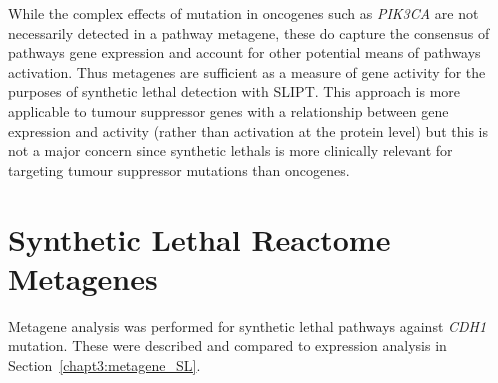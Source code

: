 While the complex effects of \gls{mutation} in \glspl{oncogene} such as \textit{PIK3CA} are not necessarily detected in a \gls{pathway} \gls{metagene}, these do capture the consensus of \glspl{pathway} \gls{gene expression} and account for other potential means of \glspl{pathway} activation. Thus \glspl{metagene} are sufficient as a measure of gene activity for the purposes of \gls{synthetic lethal} detection with \gls{SLIPT}. This approach is more applicable to \gls{tumour suppressor} genes with a relationship between \gls{gene expression} and activity (rather than activation at the protein level) but this is not a major concern since \glspl{synthetic lethal} is more clinically relevant for targeting \gls{tumour suppressor} \glspl{mutation} than \glspl{oncogene}.
\fi


\FloatBarrier


\section{Synthetic Lethal Reactome Metagenes} \label{appendix:metagene_mtSL}

Metagene analysis was performed for synthetic lethal pathways against \textit{CDH1} mutation. These were described and compared to expression analysis in Section~\ref{chapt3:metagene_SL}. 

